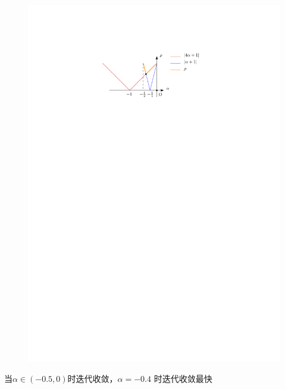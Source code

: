 \begin{example}
\begin{solution}
\begin{figure}[ht]
            \includegraphics{image/迭代法rho-example.pdf}
        \end{figure}

        当$\alpha\in(-0.5,0)$时迭代收敛，$\alpha=-0.4$ 时迭代收敛最快
    \end{solution}
\end{example}
